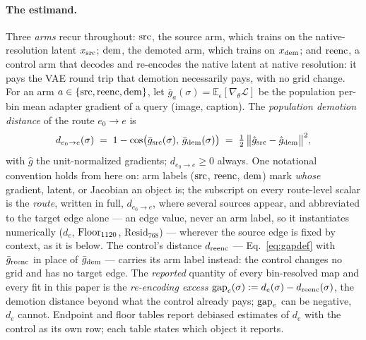 \paragraph{The estimand.}
Three \emph{arms} recur throughout: $\mathrm{src}$, the source arm,
which trains on the native-resolution latent $x_{\mathrm{src}}$; $\mathrm{dem}$,
the demoted arm, which trains on $x_{\mathrm{dem}}$; and $\mathrm{reenc}$,
a control arm that decodes and re-encodes the native latent at native
resolution: it pays the VAE round trip that demotion necessarily pays,
with no grid change. For an arm
$a \in \{\mathrm{src}, \mathrm{reenc}, \mathrm{dem}\}$, let
$\bar g_a(\sigma) = \mathbb{E}_\epsilon[\nabla_\theta \mathcal{L}]$ be
the population per-bin mean adapter gradient of a query (image,
caption). The \emph{population demotion distance} of the route
$e_0 {\to} e$ is
\begin{equation}
d_{e_0 \to e}(\sigma) \;=\; 1 - \cos\!\big(\bar g_{\mathrm{src}}(\sigma),\,
\bar g_{\mathrm{dem}}(\sigma)\big)
\;=\; \tfrac{1}{2}\,\big\|\hat g_{\mathrm{src}} - \hat g_{\mathrm{dem}}\big\|^2,
\label{eq:gapdef}
\end{equation}
with $\hat g$ the unit-normalized gradients;
$d_{e_0 \to e} \ge 0$ always. One
notational convention holds from here on: arm labels ($\mathrm{src}$, $\mathrm{reenc}$,
$\mathrm{dem}$) mark \emph{whose} gradient, latent, or Jacobian an object is;
the subscript on every route-level scalar is the \emph{route},
written in full, $d_{e_0 \to e}$, where several sources appear, and
abbreviated to the target edge alone --- an edge value, never an arm
label, so it instantiates numerically ($d_e$, $\mathrm{Floor}_{1120}$,
$\mathrm{Resid}_{768}$) --- wherever the source edge is fixed by
context, as it is below. The
control's distance $d_{\mathrm{reenc}}$ --- Eq.~\ref{eq:gapdef} with
$\bar g_{\mathrm{reenc}}$ in place of $\bar g_{\mathrm{dem}}$ --- carries its arm label
instead: the control changes no grid and has no target edge. The
\emph{reported} quantity of every bin-resolved map and every fit in this
paper is the \emph{re-encoding excess}
$\mathrm{gap}_e(\sigma) := d_e(\sigma) - d_{\mathrm{reenc}}(\sigma)$, the demotion
distance beyond what the control already pays; $\mathrm{gap}_e$ can be
negative, $d_e$ cannot. Endpoint and floor tables report debiased
estimates of $d_e$ with the control as its own row; each table states
which object it reports.

